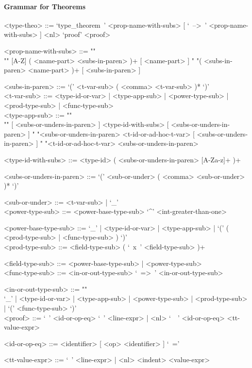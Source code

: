 \documentclass{article}
\begin{document}
\paragraph{Grammar for Theorems}

\begin{grammar}
<type-theo> ::= 
`type_theorem\ ' <prop-name-with-subs> [ `\ -->\ ' <prop-name-with-subs> ] <nl> 
`proof' <proof>

<prop-name-with-subs> ::=  ""\\""
[A-Z] ( <name-part> <subs-in-paren> )+ [ <name-part> ]
\alt " "( <subs-in-paren> <name-part> )+ [ <subs-in-paren> ]

<subs-in-paren> ::= `(' <t-var-sub> ( <comma> <t-var-sub> )* `)'
\\

<t-var-sub> ::=
<type-id-or-var> | <type-app-sub> | <power-type-sub> | <prod-type-sub> |
<func-type-sub> 
\\

<type-app-sub> ::= ""\\""
[ <subs-or-unders-in-paren> ] <type-id-with-subs> [ <subs-or-unders-in-paren> ]
\alt
" "<subs-or-unders-in-paren> <t-id-or-ad-hoc-t-var> [ <subs-or-unders-in-paren> ]
\alt
" "<t-id-or-ad-hoc-t-var> <subs-or-unders-in-paren>

<type-id-with-subs> ::= <type-id> ( <subs-or-unders-in-paren> [A-Za-z]+ )+

<subs-or-unders-in-paren> ::=
`(' <sub-or-under> ( <comma> <sub-or-under> )* `)'

<sub-or-under> ::= <t-var-sub> | `_'
\\

<power-type-sub> ::= <power-base-type-sub> `^' <int-greater-than-one>

<power-base-type-sub> ::= 
`_' | <type-id-or-var> | <type-app-sub> |
`(' ( <prod-type-sub> | <func-type-sub> ) `)'
\\

<prod-type-sub> ::= <field-type-sub> ( `\ x\ ' <field-type-sub> )+

<field-type-sub> ::= <power-base-type-sub> | <power-type-sub>
\\

<func-type-sub> ::= <in-or-out-type-sub> `\ =>\ ' <in-or-out-type-sub>

<in-or-out-type-sub> ::= ""\\
`_' | <type-id-or-var> | <type-app-sub> | <power-type-sub> | <prod-type-sub> |
`(' <func-type-sub> `)'
\\

<proof> ::= 
`\ ' <id-or-op-eq> `\ ' <line-expr> | <nl> `\ \ ' <id-or-op-eq>  <tt-value-expr>

<id-or-op-eq> ::= <identifier> [ <op> <identifier> ] `\ ='

<tt-value-expr> ::= `\ ' <line-expr> | <nl> <indent> <value-expr>
\end{grammar} 
\end{document}
